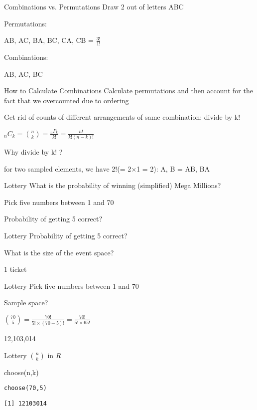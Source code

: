 \documentclass[presentation]{beamer}
\begin{document}
\begin{frame}[label={sec:org50b70f4}]{Combinations vs. Permutations}
Draw 2 out of letters ABC

Permutations:
\pause

AB, AC, BA, BC, CA, CB =  \(\frac{3!}{1!}\)

Combinations:

\pause

AB, AC, BC
\end{frame}

\begin{frame}[label={sec:orgfc283d2}]{How to Calculate Combinations}
Calculate permutations and then account for the fact that we overcounted due to ordering

Get rid of counts of different arrangements of same combination: divide by k!

\(_{n}C_{k} = {n \choose k} = \frac{_{n}P_{k}}{k!} = \frac{n!}{k!(n-k)!}\)


\pause
Why divide by k! ?

\pause
for two sampled elements, we have 2!(= 2×1 = 2): A, B = AB, BA
\end{frame}


\begin{frame}[label={sec:org756b27c}]{Lottery}
What is the probability of winning (simplified) Mega Millions?

Pick five numbers between 1 and 70

Probability of getting 5 correct?
\end{frame}


\begin{frame}[label={sec:org7961039}]{Lottery}
Probability of getting 5 correct?

What is the size of the event space?

\pause

1 ticket
\end{frame}


\begin{frame}[label={sec:org215f61d}]{Lottery}
Pick five numbers between 1 and 70

Sample space?

\pause

\({70 \choose 5} = \frac{70!}{5! \times (70-5)!} =  \frac{70!}{5! \times 65!}\)


\pause

12,103,014
\end{frame}

\begin{frame}[fragile,label={sec:orgb1df01a}]{Lottery}
 \({n \choose k}\) in \emph{R}

choose(n,k)

\begin{verbatim}
choose(70,5)
\end{verbatim}

\begin{verbatim}
[1] 12103014
\end{verbatim}
\end{frame}
\end{document}
